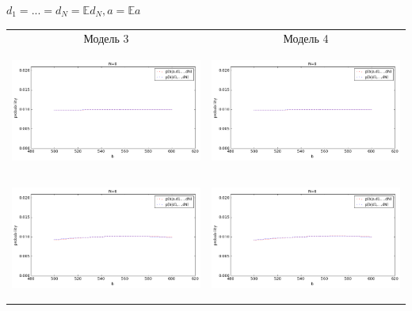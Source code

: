 \documentclass[12pt, a4paper]{article}
\begin{document}
			\newpage
			\begin{center}
			$d_1 = ... = d_N = \mathbb{E} d_N, a = \mathbb{E}a$
			
			\begin{tabular}{ c  c }
  				Модель 3 & Модель 4 \\
  				\includegraphics[width=8cm, height=4cm]{graphs/m3_ex_n0.png} &
  				\includegraphics[width=8cm, height=4cm]{graphs/m4_ex_n0.png} \\
  				
  				\includegraphics[width=8cm, height=4cm]{graphs/m3_ex_n6.png} &
                \includegraphics[width=8cm, height=4cm]{graphs/m4_ex_n6.png} \\
                

\end{tabular}
\end{center}
\end{document}
